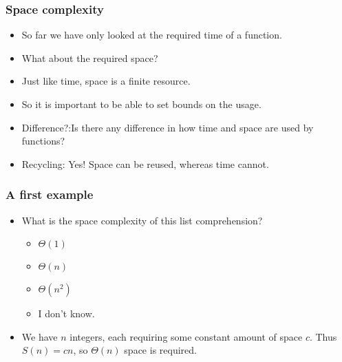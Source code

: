 \begin{frame}
	\frametitle{Space complexity}
	\begin{itemize}
		\item So far we have only looked at the required \alert{time} of a function.
		\item What about the required \alert{space}?
			
		\item Just like time, space is a \alert{finite} resource.	
		\item So it is important to be able to set bounds on the usage.
	
		\item Difference?:Is there any difference in how time and space are used by functions?
		\item Recycling:	Yes! Space can be reused, whereas time cannot.
	\end{itemize}
\end{frame}

\begin{frame}
	\frametitle{A first example}
	
			\begin{itemize}
				\item What is the \alert{space} complexity of this list comprehension?
			
			\begin{itemize}
				\item $\Theta(1)$
				\item $\Theta(n)$ 
				\item $\Theta(n^2)$
				\item I don't know.
			\end{itemize}
				\item We have $n$ integers, each requiring some constant amount of space $c$. Thus $S(n) = cn$, so $\Theta(n)$ space is
		required.
			\end{itemize}
		
		
\end{frame}


